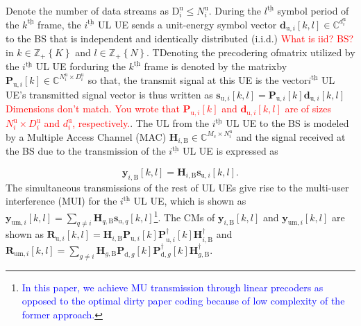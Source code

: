 \documentclass[9pt,journal]{IEEEtran}
\newcommand{\bracket}[1]{{\left [{#1}\right ]}}
\newcommand{\braces}[1]{{\left\{ {#1}\right\}}}
\newcommand{\ith}[1]    {{#1}^{\underline{\text{th}}}}
\newcommand{\cc}{_\mathrm{c}}
\newcommand{\B}{\textrm{B}}
\newcommand{\dui}{\mathbf{d}_{\textrm{u},i}\bracket{k,l}}
\newcommand{\PiB}{\mathbf{P}_{\textrm{u},i}\bracket{k}}
\newcommand{\PiBH}{\mathbf{P}^\dagger_{\textrm{u},i}\bracket{k}}
\newcommand{\PBg}{\mathbf{P}_{\textrm{d},g}\bracket{k}}
\newcommand{\PBgH}{\mathbf{P}^\dagger_{\textrm{d},g}\bracket{k}}
\newcommand{\HiB}{\mathbf{H}_{i,\textrm{B}}}
\newcommand{\HiBH}{\mathbf{H}^\dagger_{i,\textrm{B}}}
\theoremstyle{definition}
\begin{document}
Denote the number of data streams as $\mathrm{D}^\textrm{u}_i\leq \mathit{N}^{\textrm{u}}_i$. During the $\ith{l}$ symbol period of the $\ith{k}$ frame, the $\ith{i}$ UL UE sends a unit-energy symbol vector $\mathbf{d}_{\textrm{u},i}\bracket{k,l}\in \mathbb{C}^{d^{\textrm{u}}_i}$ to the BS that is independent and identically distributed (i.i.d.) \textcolor{red}{What is iid? BS?} in $k\in\mathbb{Z}_+\braces{\mathit{K}}$ and $l\in\mathbb{Z}_+\braces{\mathit{N}}$. TDenoting the precodering ofmatrix utilized by the $\ith{i}$ UL UE forduring the $\ith{k}$ frame is denoted by the matrixby $\PiB\in\mathbb{C}^{\mathit{N}^{\textrm{u}}_i\times \mathit{D}^\textrm{u}_i}$ so that, the transmit signal at this UE is the vector$\ith{i}$ UL UE's transmitted signal vector is thus written as $\mathbf{s}_{\textrm{u},i}\bracket{k,l}=\PiB\mathbf{d}_{\textrm{u},i}\bracket{k,l}$ \textcolor{red}{Dimensions don't match. You wrote that $\PiB$ and $\mathbf{d}_{\textrm{u},i}\bracket{k,l}$ are of sizes $\mathit{N}^{\textrm{u}}_i\times \mathit{D}^\textrm{u}_i$ and $d^{\textrm{u}}_i$, respectively.}. The UL from the $\ith{i}$ UL UE to the BS is modeled by a Multiple Access Channel (MAC) $\mathbf{H}_{i,\textrm{B}}\in\mathbb{C}^{\mathit{M}\cc\times \mathit{N}^{\textrm{u}}_i}$ and the signal received at the BS due to the transmission of the $\ith{i}$ UL UE is expressed as 
  \par\noindent\small
\begin{equation}
\label{ULFDcomm}
\mathbf{y}_{i,\textrm{B}}\bracket{k,l}=\mathbf{H}_{i,\textrm{B}}\mathbf{s}_{\textrm{u},i}\bracket{k,l}.
\end{equation}
\normalsize
The simultaneous transmissions of the rest of UL UEs give rise to the multi-user interference (MUI) for the $\ith{i}$ UL UE, which is shown as  $\mathbf{y}_{\textrm{um},i}\bracket{k,l}=\sum_{q\neq i}\mathbf{H}_{q,\textrm{B}}\mathbf{s}_{\textrm{u},q}\bracket{k,l}$\footnote{\textcolor{blue}{In this paper, we achieve MU transmission through linear precoders as opposed to the optimal dirty paper coding because of low complexity of the former approach\cite{MIMOcom}.}}. The CMs of 
$\mathbf{y}_{i,\textrm{B}}\bracket{k,l}$ and $\mathbf{y}_{\textrm{um},i}\bracket{k,l}$ are shown as $\mathbf{R}_{\textrm{u},i}\bracket{k,l}=\HiB\PiB\PiBH\HiBH$ and
$\mathbf{R}_{\textrm{um},i}\bracket{k,l}=\sum_{g\neq i }\mathbf{H}_{g,\textrm{B}}\PBg\PBgH\mathbf{H}^\dagger_{g,\textrm{B}}$.
\end{document}
